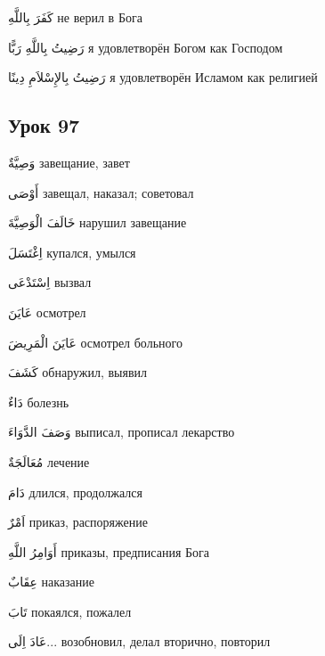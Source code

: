 \documentclass[a5paper]{article}
\newcommand\textstyleDropCaps[1]{#1}
\newcommand\textstyleCaptioncharacters[1]{#1}
\begin{document}
\textstyleCaptioncharacters{كَفَرَ بِاللَّهِ }\textstyleDropCaps{не верил в Бога‎}

\textstyleCaptioncharacters{رَضِيتُ بِاللَّهِ رَبًّا }\textstyleDropCaps{я удовлетворён Богом как Господом‎}

\textstyleCaptioncharacters{رَضِيتُ بِالإِسْلاَمِ دِينًا }\textstyleDropCaps{я удовлетворён Исламом как религией‎}

\subsection[Урок 97‎]{\textstyleDropCaps{Урок 97‎}}
\textstyleCaptioncharacters{وَصِيَّةٌ }\textstyleDropCaps{завещание, завет‎}

\textstyleCaptioncharacters{أَوْصَى }\textstyleDropCaps{завещал, наказал; советовал‎}

\textstyleCaptioncharacters{خَالَفَ الْوَصِيَّةَ }\textstyleDropCaps{нарушил завещание‎}

\textstyleCaptioncharacters{اِغْتَسَلَ }\textstyleDropCaps{купался, умылся‎}

\textstyleCaptioncharacters{اِسْتَدْعَى }\textstyleDropCaps{вызвал‎}

\textstyleCaptioncharacters{عَايَنَ }\textstyleDropCaps{осмотрел‎}

\textstyleCaptioncharacters{عَايَنَ الْمَرِيضَ }\textstyleDropCaps{осмот­рел больного‎}

\textstyleCaptioncharacters{كَشَفَ }\textstyleDropCaps{обнаружил, вы­явил‎}

\textstyleCaptioncharacters{دَاءٌ }\textstyleDropCaps{болезнь‎}

\textstyleCaptioncharacters{وَصَفَ الدَّوَاءَ }\textstyleDropCaps{выписал, прописал лекарство‎}

\textstyleCaptioncharacters{مُعَالَجَةٌ }\textstyleDropCaps{лечение‎}

\textstyleCaptioncharacters{دَامَ }\textstyleDropCaps{длился, продолжался‎}

\textstyleCaptioncharacters{اَمْرٌ }\textstyleDropCaps{приказ, распоряжение‎}

\textstyleCaptioncharacters{أَوَامِرُ اللَّهِ }\textstyleDropCaps{приказы, пред­писания Бога‎}

\textstyleCaptioncharacters{عِقَابٌ }\textstyleDropCaps{наказание‎}

\textstyleCaptioncharacters{تَابَ }\textstyleDropCaps{покаялся, пожалел‎}

\textstyleCaptioncharacters{عَادَ اِلَى... }\textstyleDropCaps{возобновил, де­лал вторично, повторил‎}
\end{document}
